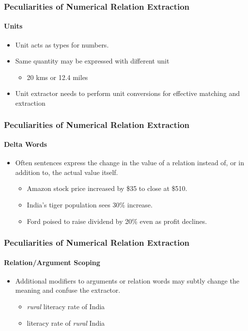 \documentclass{beamer}
\begin{document}
\begin{frame}
\frametitle{Peculiarities of Numerical Relation Extraction}
\framesubtitle{Units}
\begin{itemize}
\item Unit acts as types for numbers.
\item Same quantity may be expressed with different unit
	\begin{itemize}
    	\item 20 kms or 12.4 miles
   	\end{itemize}
\item Unit extractor needs to perform unit conversions for effective matching and extraction
\end{itemize}
\end{frame}

\begin{frame}
\frametitle{Peculiarities of Numerical Relation Extraction}
\framesubtitle{Delta Words}

\begin{itemize}
\item Often sentences express the change in the value of a relation instead of, or in addition to, the actual value itself.
\begin{itemize}
\item Amazon stock price increased by \$35 to close at \$510.
\item India's tiger population sees 30\% increase.
\item Ford poised to raise dividend by 20\% even as profit declines.
\end{itemize}
\end{itemize}
\end{frame}

\begin{frame}
\frametitle{Peculiarities of Numerical Relation Extraction}
\framesubtitle{Relation/Argument Scoping}

\begin{itemize}
\item Additional modifiers to arguments or relation words may subtly change the meaning and confuse the extractor.
\begin{itemize}
\item \emph{rural} literacy rate of India
\item literacy rate of \emph{rural} India
\end{itemize}
\end{itemize}

\end{frame}
\end{document}
